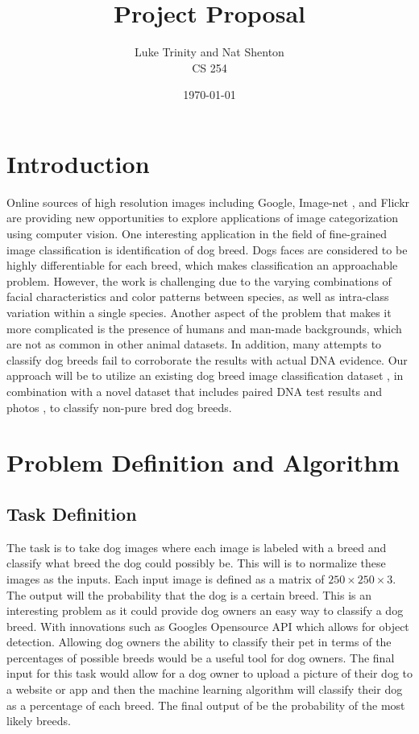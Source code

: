 \documentclass[12pt]{article}
\title{Project Proposal}
\date{\today}
\author{Luke Trinity and Nat Shenton \\  CS 254}
\begin{document}
 
\maketitle
\section{Introduction}

Online sources of high resolution images including Google, Image-net \cite{deng2009imagenet}, and Flickr are providing new opportunities to explore applications of image categorization using computer vision. One interesting application in the field of fine-grained image classification is identification of dog breed. Dogs faces are considered to be highly differentiable for each breed, which makes classification an approachable problem.  However, the work is challenging due to the varying combinations of facial characteristics and color patterns between species, as well as intra-class variation within a single species. Another aspect of the problem that makes it more complicated is the presence of humans and man-made backgrounds, which are not as common in other animal datasets. In addition, many attempts to classify dog breeds fail to corroborate the results with actual DNA evidence. Our approach will be to utilize an existing dog breed image classification dataset \cite{khosla2011novel}, in combination with a novel dataset that includes paired DNA test results and photos \cite{voith2009comparison}, to  classify non-pure bred dog breeds. 

\section{Problem Definition and Algorithm}

\subsection{Task Definition}

The task is to take dog images where each image is labeled with a breed and classify what breed the dog could possibly be.  This will is to normalize these images as the inputs.  Each input image is defined as a matrix of $250\times 250 \times 3$.  The output will the probability that the dog is a certain breed.  This is an interesting problem as it could provide dog owners an easy way to classify a dog breed.  With innovations such as Googles Opensource API which allows for object detection.  Allowing dog owners the ability to classify their pet in terms of the percentages of possible breeds would be a useful tool for dog owners.  The final input for this task would allow for a dog owner to upload a picture of their dog to a website or app and then the machine learning algorithm will classify their dog as a percentage of each breed.  The final output of be the probability of the most likely breeds.
\end{document}
